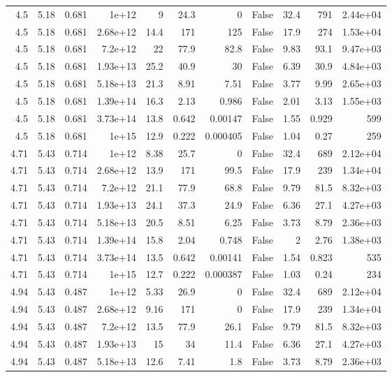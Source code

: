\begin{table}
\begin{tabular}{rrrrrrrrrrr}
4.5 & 5.18 & 0.681 & 1e+12 & 9 & 24.3 & 0 & False & 32.4 & 791 & 2.44e+04 \\
4.5 & 5.18 & 0.681 & 2.68e+12 & 14.4 & 171 & 125 & False & 17.9 & 274 & 1.53e+04 \\
4.5 & 5.18 & 0.681 & 7.2e+12 & 22 & 77.9 & 82.8 & False & 9.83 & 93.1 & 9.47e+03 \\
4.5 & 5.18 & 0.681 & 1.93e+13 & 25.2 & 40.9 & 30 & False & 6.39 & 30.9 & 4.84e+03 \\
4.5 & 5.18 & 0.681 & 5.18e+13 & 21.3 & 8.91 & 7.51 & False & 3.77 & 9.99 & 2.65e+03 \\
4.5 & 5.18 & 0.681 & 1.39e+14 & 16.3 & 2.13 & 0.986 & False & 2.01 & 3.13 & 1.55e+03 \\
4.5 & 5.18 & 0.681 & 3.73e+14 & 13.8 & 0.642 & 0.00147 & False & 1.55 & 0.929 & 599 \\
4.5 & 5.18 & 0.681 & 1e+15 & 12.9 & 0.222 & 0.000405 & False & 1.04 & 0.27 & 259 \\
4.71 & 5.43 & 0.714 & 1e+12 & 8.38 & 25.7 & 0 & False & 32.4 & 689 & 2.12e+04 \\
4.71 & 5.43 & 0.714 & 2.68e+12 & 13.9 & 171 & 99.5 & False & 17.9 & 239 & 1.34e+04 \\
4.71 & 5.43 & 0.714 & 7.2e+12 & 21.1 & 77.9 & 68.8 & False & 9.79 & 81.5 & 8.32e+03 \\
4.71 & 5.43 & 0.714 & 1.93e+13 & 24.1 & 37.3 & 24.9 & False & 6.36 & 27.1 & 4.27e+03 \\
4.71 & 5.43 & 0.714 & 5.18e+13 & 20.5 & 8.51 & 6.25 & False & 3.73 & 8.79 & 2.36e+03 \\
4.71 & 5.43 & 0.714 & 1.39e+14 & 15.8 & 2.04 & 0.748 & False & 2 & 2.76 & 1.38e+03 \\
4.71 & 5.43 & 0.714 & 3.73e+14 & 13.5 & 0.642 & 0.00141 & False & 1.54 & 0.823 & 535 \\
4.71 & 5.43 & 0.714 & 1e+15 & 12.7 & 0.222 & 0.000387 & False & 1.03 & 0.24 & 234 \\
4.94 & 5.43 & 0.487 & 1e+12 & 5.33 & 26.9 & 0 & False & 32.4 & 689 & 2.12e+04 \\
4.94 & 5.43 & 0.487 & 2.68e+12 & 9.16 & 171 & 0 & False & 17.9 & 239 & 1.34e+04 \\
4.94 & 5.43 & 0.487 & 7.2e+12 & 13.5 & 77.9 & 26.1 & False & 9.79 & 81.5 & 8.32e+03 \\
4.94 & 5.43 & 0.487 & 1.93e+13 & 15 & 34 & 11.4 & False & 6.36 & 27.1 & 4.27e+03 \\
4.94 & 5.43 & 0.487 & 5.18e+13 & 12.6 & 7.41 & 1.8 & False & 3.73 & 8.79 & 2.36e+03 \\

\end{tabular}
\end{table}

